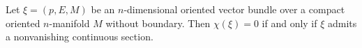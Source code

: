 Let $\xi = (p, E, M)$ be an $n$-dimensional oriented vector bundle over a compact oriented $n$-manifold $M$ without boundary. Then $\chi(\xi) = 0$ if and only if $\xi$ admits a nonvanishing continuous section.
